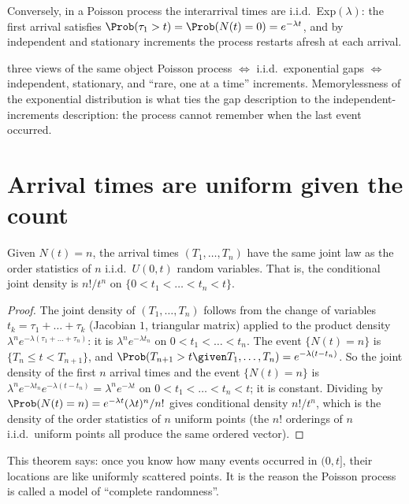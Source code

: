 Conversely, in a Poisson process the interarrival times are i.i.d.\ Exp$(\lambda)$: the
first arrival satisfies $\Prob(\tau_1>t)=\Prob(N(t)=0)=e^{-\lambda t}$, and by independent
and stationary increments the process restarts afresh at each arrival.

\begin{nuance}{three views of the same object}
Poisson process $\iff$ i.i.d.\ exponential gaps $\iff$ independent, stationary,
and ``rare, one at a time'' increments. Memorylessness of the exponential distribution
is what ties the gap description to the independent-increments description: the process
cannot remember when the last event occurred.
\end{nuance}

\section{Arrival times are uniform given the count}

\begin{theorem}\label{thm:ppuniform}
Given $N(t)=n$, the arrival times $(T_1,\dots,T_n)$ have the same joint law as the order
statistics of $n$ i.i.d.\ $U(0,t)$ random variables. That is, the conditional joint density
is $n!/t^n$ on $\{0<t_1<\dots<t_n<t\}$.
\end{theorem}
\begin{proof}
The joint density of $(T_1,\dots,T_n)$ follows from the change of variables
$t_k=\tau_1+\dots+\tau_k$ (Jacobian $1$, triangular matrix) applied to the product
density $\lambda^ne^{-\lambda(\tau_1+\dots+\tau_n)}$: it is $\lambda^ne^{-\lambda t_n}$ on
$0<t_1<\dots<t_n$. The event $\{N(t)=n\}$ is $\{T_n\le t<T_{n+1}\}$, and
$\Prob(T_{n+1}>t\given T_1,\dots,T_n)=e^{-\lambda(t-t_n)}$. So the joint density of the
first $n$ arrival times and the event $\{N(t)=n\}$ is
$\lambda^ne^{-\lambda t_n}e^{-\lambda(t-t_n)}=\lambda^ne^{-\lambda t}$ on
$0<t_1<\dots<t_n<t$; it is constant. Dividing by $\Prob(N(t)=n)=e^{-\lambda t}(\lambda t)^n/n!$
gives conditional density $n!/t^n$, which is the density of the order statistics of $n$
uniform points (the $n!$ orderings of $n$ i.i.d.\ uniform points all produce the same
ordered vector).
\end{proof}

This theorem says: once you know how many events occurred in $(0,t]$, their locations are
like uniformly scattered points. It is the reason the Poisson process is called a model of
``complete randomness''.

